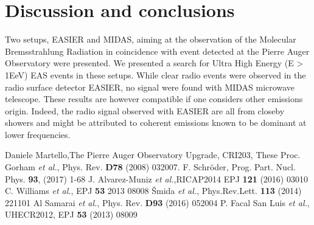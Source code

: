 \documentclass{PoS}
\begin{document}
\section{Discussion and conclusions}
Two setups, EASIER and MIDAS, aiming at the observation of the  Molecular Bremsstrahlung Radiation in coincidence with event detected at the Pierre Auger Observatory were presented. We presented a search for Ultra High Energy (E > 1EeV) EAS events in these setups. While clear radio events were observed in the radio surface detector EASIER, no signal were found with MIDAS microwave telescope. These results are however compatible if one considers other emissions origin. Indeed, the radio signal observed with EASIER are all from closeby showers and might be attributed to coherent emissions known to be dominant at lower frequencies. 



\begin{thebibliography}{99}
Daniele Martello,The Pierre Auger Observatory Upgrade, CRI203, These Proc.
Gorham \textit{et al.}, Phys. Rev. \textbf{D78} (2008) 032007.
 F. Schr\"{o}der, Prog. Part. Nucl. Phys. \textbf{93}, (2017) 1-68
J. Alvarez-Muniz \textit{et al.},RICAP2014 EPJ \textbf{121} (2016) 03010
 C. Williams \textit{et al.}, EPJ  \textbf{53} 2013 08008
\v{S}mida \textit{et al.}, Phys.Rev.Lett. \textbf{113} (2014) 221101 
Al Samarai \textit{et al.}, Phys. Rev. \textbf{D93} (2016) 052004
 P. Facal San Luis \textit{et al.}, UHECR2012, EPJ \textbf{53} (2013) 08009
\end{thebibliography}
\end{document}
